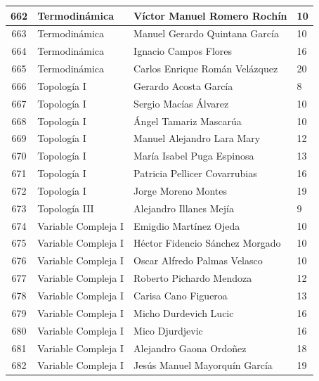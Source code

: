 {\begin{longtable}{|c|p{6.5cm}|p{5cm}|p{1.5cm}|}
  662 & Termodinámica & Víctor Manuel Romero Rochín & 10 \\ \hline
  663 & Termodinámica & Manuel Gerardo Quintana García & 10 \\ \hline
  664 & Termodinámica & Ignacio Campos Flores & 16 \\ \hline
  665 & Termodinámica & Carlos Enrique Román Velázquez & 20 \\ \hline
  666 & Topología I & Gerardo Acosta García & 8 \\ \hline
  667 & Topología I & Sergio Macías Álvarez & 10 \\ \hline
  668 & Topología I & Ángel Tamariz Mascarúa & 10 \\ \hline
  669 & Topología I & Manuel Alejandro Lara Mary & 12 \\ \hline
  670 & Topología I & María Isabel Puga Espinosa & 13 \\ \hline
  671 & Topología I & Patricia Pellicer Covarrubias & 16 \\ \hline
  672 & Topología I & Jorge Moreno Montes & 19 \\ \hline
  673 & Topología III & Alejandro Illanes Mejía & 9 \\ \hline
  674 & Variable Compleja I & Emigdio Martínez Ojeda & 10 \\ \hline
  675 & Variable Compleja I & Héctor Fidencio Sánchez Morgado & 10 \\ \hline
  676 & Variable Compleja I & Oscar Alfredo Palmas Velasco & 10 \\ \hline
  677 & Variable Compleja I & Roberto Pichardo Mendoza & 12 \\ \hline
  678 & Variable Compleja I & Carisa Cano Figueroa & 13 \\ \hline
  679 & Variable Compleja I & Micho Durdevich Lucic & 16 \\ \hline
  680 & Variable Compleja I & Mico Djurdjevic & 16 \\ \hline
  681 & Variable Compleja I & Alejandro Gaona Ordoñez & 18 \\ \hline
  682 & Variable Compleja I & Jesús Manuel Mayorquín García & 19 \\ \hline
\end{longtable}}






